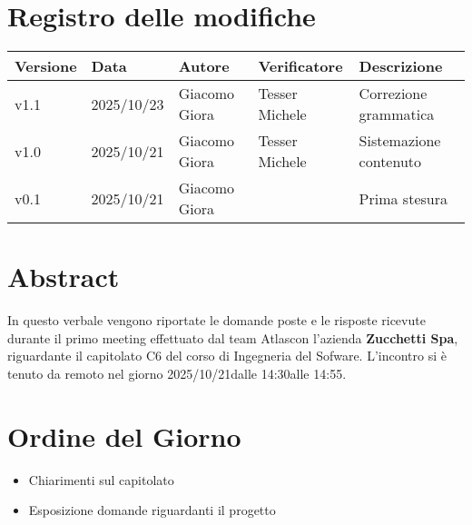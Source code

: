 \documentclass[a4paper,12pt]{article}
\newcommand{\Gruppo}{Atlas}
\newcommand{\DataVerbale}{2025/10/21}
\newcommand{\OraInizio}{14:30}
\newcommand{\OraFine}{14:55}
\newcommand{\AbstractVerbale}{%
In questo verbale vengono riportate le domande poste e le risposte ricevute durante il primo meeting effettuato dal team \Gruppo \space con l'azienda \textbf{Zucchetti Spa}, riguardante il capitolato C6 del corso di Ingegneria del Sofware. L'incontro si è tenuto da remoto nel giorno \DataVerbale \space dalle \OraInizio \space alle \OraFine.
}
\newcommand{\VersioneVerbale}{v1.1} %
\begin{document}
\section*{Registro delle modifiche}{
    \begin{center} 
        \begin{tabular}{|l|l|l|l|l|}
            \hline
            \textbf{Versione} & \textbf{Data} & \textbf{Autore} & \textbf{Verificatore} & \textbf{Descrizione} \\
            \hline
            \VersioneVerbale & 2025/10/23 & Giacomo Giora & Tesser Michele & Correzione grammatica\\ 
            \hline
            v1.0 & 2025/10/21 & Giacomo Giora & Tesser Michele & Sistemazione contenuto\\ 
            \hline
            v0.1 & 2025/10/21 & Giacomo Giora &  & Prima stesura\\ 
            \hline
       \end{tabular}
    \end{center}
}

\newpage

\tableofcontents

\newpage
\section{Abstract}{
    \begin{minipage}{0.9\textwidth}
        \small
        \AbstractVerbale
    \end{minipage}
}


\section{Ordine del Giorno}{
    \begin{itemize}
        \item Chiarimenti sul capitolato
        \item Esposizione domande riguardanti il progetto
    \end{itemize}
}
\end{document}

